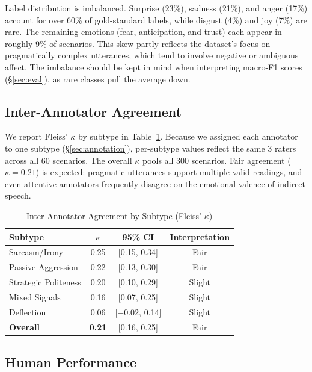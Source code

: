 \documentclass[twoside,11pt]{article}
\begin{document}
Label distribution is imbalanced. Surprise (23\%), sadness (21\%), and anger (17\%) account for over 60\% of gold-standard labels, while disgust (4\%) and joy (7\%) are rare. The remaining emotions (fear, anticipation, and trust) each appear in roughly 9\% of scenarios. This skew partly reflects the dataset's focus on pragmatically complex utterances, which tend to involve negative or ambiguous affect. The imbalance should be kept in mind when interpreting macro-F1 scores (\S\ref{sec:eval}), as rare classes pull the average down.

\subsection{Inter-Annotator Agreement}

We report Fleiss' $\kappa$ by subtype in Table~\ref{tab:agreement}. Because we assigned each annotator to one subtype (\S\ref{sec:annotation}), per-subtype values reflect the same 3 raters across all 60 scenarios. The overall $\kappa$ pools all 300 scenarios. Fair agreement ($\kappa = 0.21$) is expected: pragmatic utterances support multiple valid readings, and even attentive annotators frequently disagree on the emotional valence of indirect speech.

\begin{table}[t]
\caption{Inter-Annotator Agreement by Subtype (Fleiss' $\kappa$)}
\label{tab:agreement}
\centering
\small
\begin{tabular}{@{}lccc@{}}
\toprule
\textbf{Subtype} & \textbf{$\kappa$} & \textbf{95\% CI} & \textbf{Interpretation} \\
\midrule
Sarcasm/Irony & 0.25 & [0.15, 0.34] & Fair \\
Passive Aggression & 0.22 & [0.13, 0.30] & Fair \\
Strategic Politeness & 0.20 & [0.10, 0.29] & Slight \\
Mixed Signals & 0.16 & [0.07, 0.25] & Slight \\
Deflection & 0.06 & [$-$0.02, 0.14] & Slight \\
\midrule
\textbf{Overall} & \textbf{0.21} & [0.16, 0.25] & Fair \\
\bottomrule
\end{tabular}
\end{table}

\subsection{Human Performance}
\end{document}
